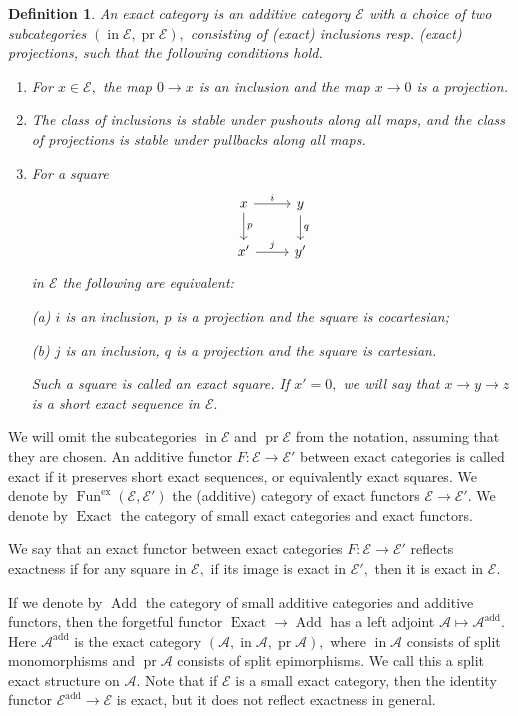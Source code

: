 \documentclass[11pt,leqno]{amsart}
\newtheorem{defi}[theo]{Definition}
\numberwithin{equation}{section}
\newcommand{\ex}{\operatorname{ex}}
\newcommand{\cA}{{\mathcal A}}
\newcommand{\cE}{{\mathcal E}}
\newcommand{\Fun}{\operatorname{Fun}}
\newcommand{\Add}{\operatorname{Add}}
\newcommand{\Exact}{\operatorname{Exact}}
\newcommand{\add}{\operatorname{add}}
\newcommand{\iin}{\operatorname{in}}
\newcommand{\pr}{\operatorname{pr}}
\begin{document}
\begin{defi}\cite[Section 3]{Bar15}\label{def:small_exact}
An exact category is an additive category $\cE$ with a choice of two subcategories $(\iin \cE,\pr \cE),$ consisting of (exact) inclusions resp. (exact) projections, such that the following conditions hold.
 \begin{enumerate}[label=(\roman*),ref=(\roman*)]
 	\item For $x\in\cE,$ the map $0\to x$ is an inclusion and the map $x\to 0$ is a projection.
 	\item The class of inclusions is stable under pushouts along all maps, and the class of projections is stable under pullbacks along all maps.
 	\item For a square 
 	\begin{equation*}\label{eq:exact_square}
 	\begin{tikzcd}
 	x\ar[r, "i"]\ar[d, "p"] & y\ar[d, "q"]\\
 	x'\ar[r, "j"] & y'
 	\end{tikzcd}
 	\end{equation*}
 in $\cE$ the following are equivalent:
 
 (a) $i$ is an inclusion, $p$ is a projection and the square is cocartesian;
 
 (b) $j$ is an inclusion, $q$ is a projection and the square is cartesian.
 
\noindent Such a square is called an exact square. If $x'=0,$ we will say that $x\to y\to z$ is a short exact sequence in $\cE.$
 \end{enumerate}
\end{defi} 

We will omit the subcategories $\iin \cE$ and $\pr \cE$ from the notation, assuming that they are chosen. An additive functor $F:\cE\to\cE'$ between exact categories is called exact if it preserves short exact sequences, or equivalently exact squares. We denote by $\Fun^{\ex}(\cE,\cE')$ the (additive) category of exact functors $\cE\to\cE'.$ We denote by $\Exact$ the category of small exact categories and exact functors.

We say that an exact functor between exact categories $F:\cE\to\cE'$ reflects exactness if for any square in $\cE,$ if its image is exact in $\cE',$ then it is exact in $\cE.$

If we denote by $\Add$ the category of small additive categories and additive functors, then the forgetful functor $\Exact\to\Add$ has a left adjoint $\cA\mapsto\cA^{\add}.$ Here $\cA^{\add}$ is the exact category $(\cA,\iin \cA,\pr \cA),$ where $\iin \cA$ consists of split monomorphisms and $\pr \cA$ consists of split epimorphisms. We call this a split exact structure on $\cA.$ Note that if $\cE$ is a small exact category, then the identity functor $\cE^{\add}\to \cE$ is exact, but it does not reflect exactness in general. 
\end{document}
